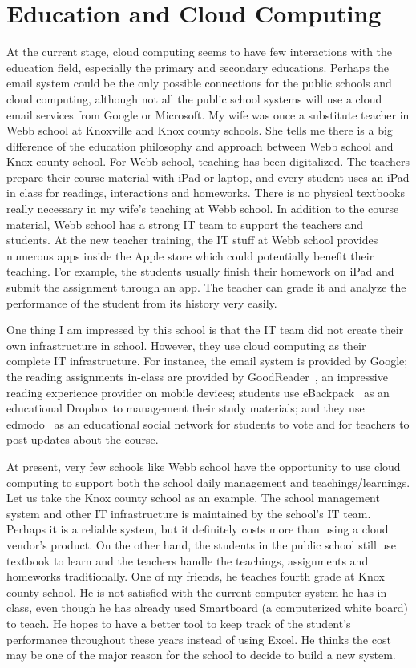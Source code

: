 \section{Education and Cloud Computing}
At the current stage, cloud computing seems to have few interactions with the education field, especially the primary and secondary educations. Perhaps the email system could be the only possible connections for the public schools and cloud computing, although not all the public school systems will use a cloud email services from Google or Microsoft. My wife was once a substitute teacher in Webb school at Knoxville and Knox county schools. She tells me there is a big difference of the education philosophy and approach between Webb school and Knox county school. For Webb school, teaching has been digitalized. The teachers prepare their course material with iPad or laptop, and every student uses an iPad in class for readings, interactions and homeworks. There is no physical textbooks really necessary in my wife's teaching at Webb school. In addition to the course material, Webb school has a strong IT team to support the teachers and students. At the new teacher training, the IT stuff at Webb school provides numerous apps inside the Apple store which could potentially benefit their teaching. For example, the students usually finish their homework on iPad and submit the assignment through an app. The teacher can grade it and analyze the performance of the student from its history very easily. 

One thing I am impressed by this school is that the IT team did not create their own infrastructure in school. However, they use cloud computing as their complete IT infrastructure. For instance, the email system is provided by Google; the reading assignments in-class are provided by GoodReader~\cite{goodreader}, an impressive reading experience provider on mobile devices; students use eBackpack~\cite{ebackpack} as an educational Dropbox to management their study materials; and they use edmodo~\cite{edmodo} as an educational social network for students to vote and for teachers to post updates about the course. 

At present, very few schools like Webb school have the opportunity to use cloud computing to support both the school daily management and teachings/learnings. Let us take the Knox county school as an example. The school management system  and other IT infrastructure is maintained by the school's IT team. Perhaps it is a reliable system, but it definitely costs more than using a cloud vendor's product. On the other hand, the students in the public school still use textbook to learn and the teachers handle the teachings, assignments and homeworks traditionally. One of my friends, he teaches fourth grade at Knox county school. He is not satisfied with the current computer system he has in class, even though he has already used Smartboard (a computerized white board) to teach. He hopes to have a better tool to keep track of the student's performance throughout these years instead of using Excel. He thinks the cost may be one of the major reason for the school to decide to build a new system.

